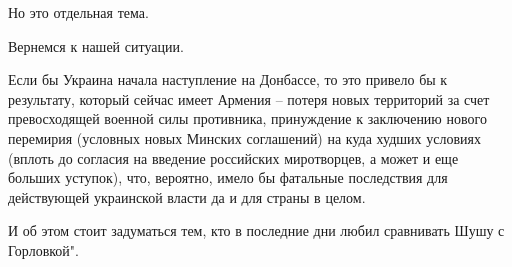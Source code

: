 Но это отдельная тема.

Вернемся к нашей ситуации.

Если бы Украина начала наступление на Донбассе, то это привело бы к результату,
который сейчас имеет Армения – потеря новых территорий за счет превосходящей
военной силы противника, принуждение к заключению нового перемирия (условных
новых Минских соглашений) на куда худших условиях (вплоть до согласия на
введение российских миротворцев, а может и еще больших уступок), что, вероятно,
имело бы фатальные последствия для действующей украинской власти да и для
страны в целом.

И об этом стоит задуматься тем, кто в последние дни любил сравнивать Шушу с
Горловкой".
